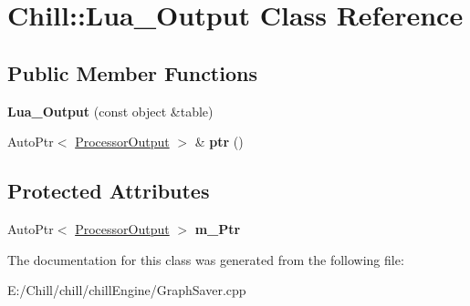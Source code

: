 \hypertarget{class_chill_1_1_lua___output}{}\section{Chill\+:\+:Lua\+\_\+\+Output Class Reference}
\label{class_chill_1_1_lua___output}
\subsection*{Public Member Functions}
\begin{DoxyCompactItemize}
\item 
\mbox{\label{class_chill_1_1_lua___output_a464b74e7af8cb34b82d4f73666b90ab4}} 
{\bfseries Lua\+\_\+\+Output} (const object \&table)
\item 
\mbox{\label{class_chill_1_1_lua___output_a6428a65075b6a5430735829b9e4bcd82}} 
Auto\+Ptr$<$ \mbox{\hyperlink{class_chill_1_1_processor_output}{Processor\+Output}} $>$ \& {\bfseries ptr} ()
\end{DoxyCompactItemize}
\subsection*{Protected Attributes}
\begin{DoxyCompactItemize}
\item 
\mbox{\label{class_chill_1_1_lua___output_a4cf36639153e56c48c3b4e855fa3d65a}} 
Auto\+Ptr$<$ \mbox{\hyperlink{class_chill_1_1_processor_output}{Processor\+Output}} $>$ {\bfseries m\+\_\+\+Ptr}
\end{DoxyCompactItemize}


The documentation for this class was generated from the following file\+:\begin{DoxyCompactItemize}
\item 
E\+:/\+Chill/chill/chill\+Engine/Graph\+Saver.\+cpp\end{DoxyCompactItemize}
